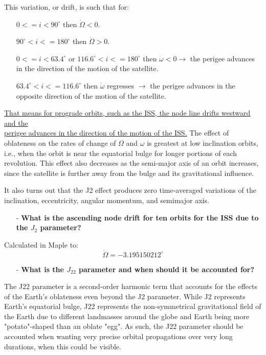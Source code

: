 This variation, or drift, is such that for:
\begin{itemize}
    \item[] $0 <= i < 90^{\circ}$ then $\Dot{\Omega} < 0$. 
    \item[] $90^{\circ} < i <= 180^{\circ}$ then $\Dot{\Omega} > 0$. 
    \item[] $0 <= i < 63.4^{\circ}$ or $116.6^{\circ} < i <= 180^{\circ}$  then $\Dot{\omega} < 0 \xrightarrow{}$ the perigee advances in the direction of the motion of the satellite.
    \item[] $63.4^{\circ} < i <= 116.6^{\circ}$ then $\Dot{\omega}$ regresses $\xrightarrow{}$ the perigee advances in the opposite direction of the motion of the satellite.
\end{itemize}

\underline{That means for prograde orbits, such as the ISS, the node line drifts westward and the} \\
\underline{perigee advances in the direction of the motion of the ISS.}
The effect of oblateness on the rates of change of $\Omega$ and $\omega$ is greatest at low inclination orbits, i.e., when the orbit is near the equatorial bulge for longer portions of each revolution. 
This effect also decreases as the semi-major axis of an orbit increases, since the satellite is further away from the bulge and its gravitational influence.

It also turns out that the J2 effect produces zero time-averaged variations of the inclination, eccentricity, angular momentum, and semimajor axis. \cite{coursebook_ch4}




\begin{itemize}
    \item[-] \textbf{What is the ascending node drift for ten orbits for the ISS due to the $J_2$ parameter?}
\end{itemize}

Calculated in Maple to: 
\[\Dot{\Omega} = -3.195150212^{\circ} \]


\begin{itemize}
    \item[-] \textbf{What is the $J_{22}$ parameter and when should it be accounted for?}
\end{itemize}

The J22 parameter is a second-order harmonic term that accounts for the effects of the Earth's oblateness even beyond the J2 parameter. 
While J2 represents Earth's equatorial bulge, J22 represents the non-symmetrical gravitational field of the Earth due to different landmasses around the globe and Earth being more "potato"-shaped than an oblate "egg". 
As such, the J22 parameter should be accounted when wanting very precise orbital propagations over very long durations, when this could be visible. 


